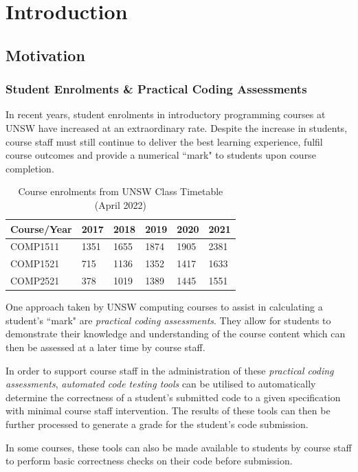 \documentclass[hidelinks]{report}
\newcommand{\unchapter}[2]{
    \setcounter{chapter}{#1}
    \setcounter{section}{0}
    \chapter*{#2}
    \addcontentsline{toc}{chapter}{#2}
}
\begin{document}
\tableofcontents

\listoffigures

\listoftables

\unchapter{1}{Introduction}

\section{Motivation}
\subsection{Student Enrolments \& Practical Coding Assessments}
In recent years, student enrolments in introductory programming courses at UNSW have increased at an extraordinary rate. Despite the increase in students, course staff must still continue to deliver the best learning experience, fulfil course outcomes and provide a numerical ``mark" to students upon course completion.

\begin{table}[h]
	\centering
	\begin{tabular}{llllll}
		\toprule
		Course/Year & 2017 & 2018 & 2019 & 2020 & 2021 \\
		\midrule
		COMP1511       & 1351 & 1655 & 1874 & 1905 & 2381 \\
		COMP1521       & 715 & 1136 & 1352 & 1417 & 1633 \\
		COMP2521       & 378 & 1019 & 1389 & 1445 & 1551 \\
		\bottomrule
	\end{tabular}
	\caption{Course enrolments from UNSW Class Timetable (April 2022)}
	\label{tab:table1}
\end{table}

One approach taken by UNSW computing courses to assist in calculating a student's ``mark" are \textit{practical coding assessments}. They allow for students to demonstrate their knowledge and understanding of the course content which can then be assessed at a later time by course staff.

In order to support course staff in the administration of these \textit{practical coding assessments}, \textit{automated code testing tools} can be utilised to automatically determine the correctness of a student's submitted code to a given specification with minimal course staff intervention. The results of these tools can then be further processed to generate a grade for the student's code submission.

In some courses, these tools can also be made available to students by course staff to perform basic correctness checks on their code before submission. 
\clearpage
\end{document}
